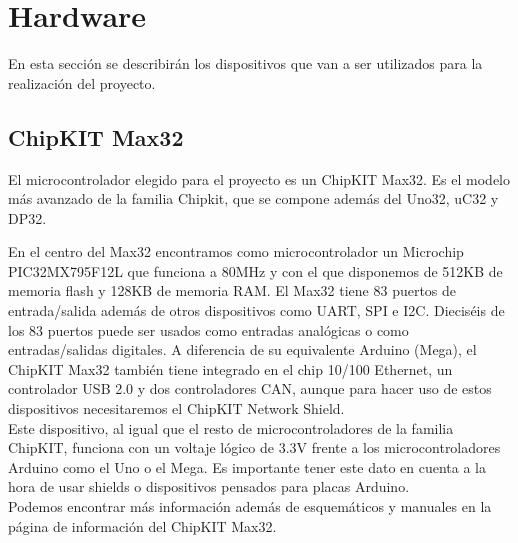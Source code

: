 

\section{Hardware}
En esta sección se describirán los dispositivos que van a ser utilizados para la realización del proyecto.

\subsection{ChipKIT Max32}
El microcontrolador elegido para el proyecto es un ChipKIT Max32. Es el modelo más avanzado de la familia Chipkit, que se compone además del Uno32, uC32 y DP32.


En el centro del Max32 encontramos como microcontrolador un Microchip PIC32MX795F12L que funciona a 80MHz y con el que disponemos de 512KB de memoria flash y 128KB de memoria RAM. El Max32 tiene 83 puertos de entrada/salida además de otros dispositivos como UART, SPI e I2C. Dieciséis de los 83 puertos puede ser usados como entradas analógicas o como entradas/salidas digitales. A diferencia de su equivalente Arduino (Mega), el ChipKIT Max32 también tiene integrado en el chip 10/100 Ethernet, un controlador USB 2.0 y dos controladores CAN, aunque para hacer uso de estos dispositivos necesitaremos el ChipKIT Network Shield.\\

Este dispositivo, al igual que el resto de microcontroladores de la familia ChipKIT, funciona con un voltaje lógico de 3.3V frente a los microcontroladores Arduino como el Uno o el Mega. Es importante tener este dato en cuenta a la hora de usar shields o dispositivos pensados para placas Arduino.\\

Podemos encontrar más información además de esquemáticos y manuales en la página de información del ChipKIT Max32\cite{website:max32}.\\

